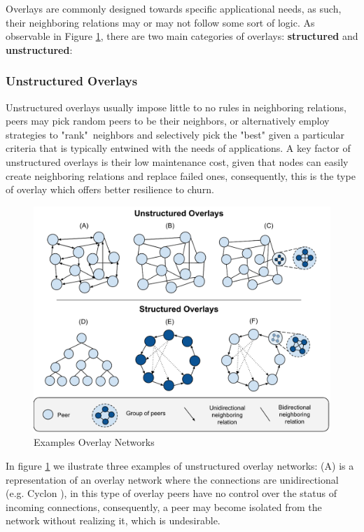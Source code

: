 Overlays are commonly designed towards specific applicational needs, as such, their neighboring relations may or may not follow some sort of logic. As observable in Figure \ref{fig:overlay_networks}, there are two main categories of overlays: \textbf{structured} and \textbf{unstructured}:

\subsubsection*{Unstructured Overlays}

Unstructured overlays usually impose little to no rules in neighboring relations, peers may pick random peers to be their neighbors, or alternatively employ strategies to "rank"\ neighbors and selectively pick the "best" given a particular criteria that is typically entwined with the needs of applications. A key factor of unstructured overlays is their low maintenance cost, given that nodes can easily create neighboring relations and replace failed ones, consequently, this is the type of overlay which offers better resilience to churn.

\begin{figure}
    \centering
    \includegraphics[width=0.8\linewidth]{Figures/overlay_networks.pdf}
    \caption{Examples Overlay Networks}
    \label{fig:overlay_networks}
\end{figure}


In figure \ref{fig:overlay_networks} we ilustrate three examples of unstructured overlay networks: (A) is a representation of an overlay network where the connections are unidirectional (e.g. Cyclon \cite{jelasity2007gossip}), in this type of overlay peers have no control over the status of incoming connections, consequently, a peer may become isolated from the network without realizing it, which is undesirable. 

